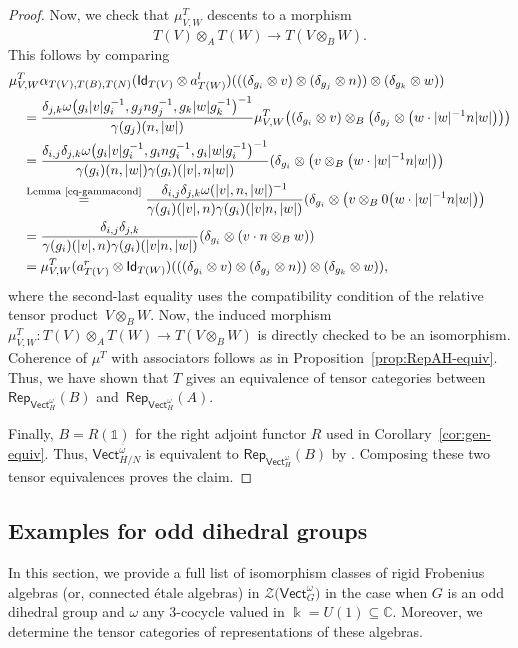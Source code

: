 \documentclass[10pt,a4paper]{amsart}
\numberwithin{equation}{section}
\newcommand{\ov}[1]{\overline{#1}}
\newcommand{\ide}{\mathsf{Id}}
\newcommand{\one}{\mathds{1}}
\newcommand{\Rep}{\mathsf{Rep}}
\newcommand{\Vect}{\mathsf{Vect}}
\newcommand{\mC}{\mathbb{C}}
\newcommand{\cZ}{\mathcal{Z}}
\begin{document}
\begin{proof}
Now, we check that $\mu_{V,W}^T$ descents to a morphism
\[T(V)\otimes_A T(W)\to T(V\otimes_B W).\]
This follows by comparing
\begin{align*}
 &\mu^{T}_{V,W}\alpha_{T(V),T(B),T(N)}(\ide_{T(V)}\otimes a^l_{T(W)})(((\delta_{g_i}\otimes v)\otimes (\delta_{g_j}\otimes n))\otimes (\delta_{g_k}\otimes w))\\
 &\quad=\frac{\delta_{j,k}\omega\big(g_i|v|g_i^{-1},g_jng_j^{-1},g_k|w|g_k^{-1}\big)^{-1}}{\gamma(g_j)(n,|w|)}\mu^{T}_{V,W}\big((\delta_{g_i}\otimes v)\otimes_B \big(\delta_{g_j}\otimes \big(w\cdot|w|^{-1}n|w|\big)\big)\big)\\
 &\quad=\frac{\delta_{i,j}\delta_{j,k}\omega\big(g_i|v|g_i^{-1},g_ing_i^{-1},g_i|w|g_i^{-1}\big)^{-1}}{\gamma(g_i)(n,|w|)\gamma(g_i)(|v|,n|w|)}(\delta_{g_i}\otimes \big(v\otimes_B \big(w\cdot|w|^{-1}n|w|\big)\big)\\
 &\quad\stackrel{\text{Lemma~\ref{eq-gammacond}}}{=} \frac{\delta_{i,j}\delta_{j,k}\omega(|v|,n,|w|)^{-1}}{\gamma(g_i)(|v|,n)\gamma(g_i)(|v|n,|w|)}(\delta_{g_i}\otimes \big(v\otimes_B 0 \big(w\cdot |w|^{-1}n|w|\big)\big)\\
 &\quad=\frac{\delta_{i,j}\delta_{j,k}}{\gamma(g_i)(|v|,n)\gamma(g_i)(|v|n,|w|)}(\delta_{g_i}\otimes (v\cdot n\otimes_B w))\\
 &\quad=\mu_{V,W}^T(a_{T(V)}^r\otimes \ide_{T(W)})(((\delta_{g_i}\otimes v)\otimes (\delta_{g_j}\otimes n))\otimes (\delta_{g_k}\otimes w)),
\end{align*}
where the second-last equality uses the compatibility condition of the relative tensor product~${V\otimes_B W}$. Now, the induced morphism $\mu_{V,W}^T\colon T(V)\otimes_A T(W)\to T(V\otimes_B W)$ is directly checked to be an isomorphism. Coherence of $\mu^T$ with associators follows as in Proposition~\ref{prop:RepAH-equiv}. Thus, we have shown that $T$ gives an equivalence of tensor categories between $\Rep_{\Vect_H^\omega}(B)$ and~$\Rep_{\Vect_H^\omega}(A)$.

Finally, $B=R(\one)$ for the right adjoint functor $R$ used in Corollary~\ref{cor:gen-equiv}. Thus, $\Vect_{H/N}^{\ov{\omega}}$ is equivalent to $\Rep_{\Vect_H^\omega}(B)$ by \cite[Proposition 6.1]{BN11}. Composing these two tensor equivalences proves the claim.
\end{proof}

\subsection{Examples for odd dihedral groups}\label{sec:expl}
In this section, we provide a full list of isomorphism classes of rigid Frobenius algebras (or, connected \'etale algebras) in $\cZ\big(\Vect_G^\omega\big)$ in the case when $G$ is an odd dihedral group and $\omega$ any $3$-cocycle valued in $\Bbbk=U(1)\subseteq \mC$. Moreover, we determine the tensor categories of representations of these algebras.
\end{document}
